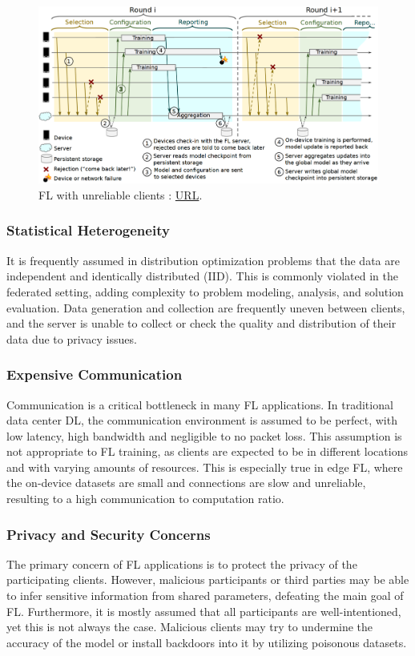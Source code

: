 \begin{figure}[H]
    \centering
        \includegraphics[width=1\textwidth]{Images/fl_protocol.png}
        \decoRule
        \caption[FL protocol]{FL with unreliable clients \cite{FL_comprehensive_survey}: \href{https://ieeexplore.ieee.org/document/9060868}{URL}.}
        \label{fig:FL protocol}
\end{figure}

\subsubsection{Statistical Heterogeneity} %
It is frequently assumed in distribution optimization problems that the data are independent and identically distributed (IID). This is commonly violated in the federated setting, adding complexity to problem modeling, analysis, and solution evaluation. Data generation and collection are frequently uneven between clients, and the server is unable to collect or check the quality and distribution of their data due to privacy issues.

\subsubsection{Expensive Communication} %
Communication is a critical bottleneck in many FL applications. In traditional data center DL, the communication environment is assumed to be perfect, with low latency, high bandwidth and negligible to no packet loss. This assumption is not appropriate to FL training, as clients are expected to be in different locations and with varying amounts of resources. This is especially true in edge FL, where the on-device datasets are small and connections are slow and unreliable, resulting to a high communication to computation ratio.

\subsubsection{Privacy and Security Concerns} %
The primary concern of FL applications is to protect the privacy of the participating clients. However, malicious participants or third parties may be able to infer sensitive information from shared parameters, defeating the main goal of FL. Furthermore, it is mostly assumed that all participants are well-intentioned, yet this is not always the case. Malicious clients may try to undermine the accuracy of the model or install backdoors into it by utilizing poisonous datasets.

